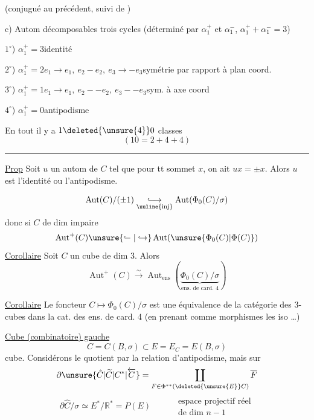 (conjugué au précédent, suivi de  )

c) Autom décomposables  trois cycles (déterminé par $\alpha_1^+$ et $\alpha_1^-$, $\alpha_1^++\alpha_1^-=3$)

$1^\circ$) $\alpha_1^+=3$\qquad identité

$2^\circ$) $\alpha_1^+=2$\qquad $e_1\to e_1,\ e_2-e_2,\ e_3\to -e_3$\qquad symétrie par rapport à plan  coord.

$3^\circ$) $\alpha_1^+=1$\qquad $e_1\to e_1,\ e_2-{-e_2},\ e_3-{-e_3}$\qquad sym.  à axe coord

$4^\circ$) $\alpha_1^+=0$\qquad antipodisme

En tout il y a $1\deleted{\unsure{4}}0$ classes 
\[
(10=2+4+4)
\]
\noindent\rule{\linewidth}{0.4pt}

\uline{Prop} Soit $u$ un autom de $C$ tel que pour tt sommet $x$, on ait $ux=\pm x$. Alors  $u$ est l'identité ou l'antipodisme.

\[
\operatorname{Aut}(C)/(\pm1)\underset{\text{\uuline{inj}}}{\lhook\joinrel\longrightarrow}\operatorname{Aut}(\Phi_0(C)/\sigma)
\]
donc si $C$ de dim impaire
\[
\operatorname{Aut}^+(C)\unsure{\lhook\joinrel\relbar|\hookrightarrow}\operatorname{Aut}(\unsure{\Phi_0(C)|\Phi(C)})
\]
\uline{Corollaire} Soit $C$ un cube de dim 3. Alors
\[
\operatorname{Aut}^+(C)\xrightarrow{\sim}\operatorname{Aut}_{\mathrm{ens}}(\underbrace{\Phi_0(C)/\sigma}_{\text{ens. de card. 4}})
\]

\uline{Corollaire} Le foncteur $C\longmapsto\Phi_0(C)/\sigma$ est une équivalence de la catégorie des 3-cubes  dans  la cat. des ens. de card. 4 (en prenant comme morphismes les iso \ldots)

\uline{Cube (combinatoire) gauche}
\[
C=C(B,\sigma)\subset E=E_C=E(B,\sigma)
\]
cube. Considérons le quotient par la relation d'antipodisme, mais sur
\[
\partial\unsure{\hat C|\widetilde C|C^*|\overleftarrow C}=\coprod_{F\in\Phi^{**}(\deleted{\unsure{E}}C)}\overline F
\]
\[
\partial\hat C/\sigma\simeq E^*/\mathbb R^*=P(E)\qquad
\begin{aligned}&\text{espace projectif réel}\\&\text{de dim }n-1\end{aligned}
\]

